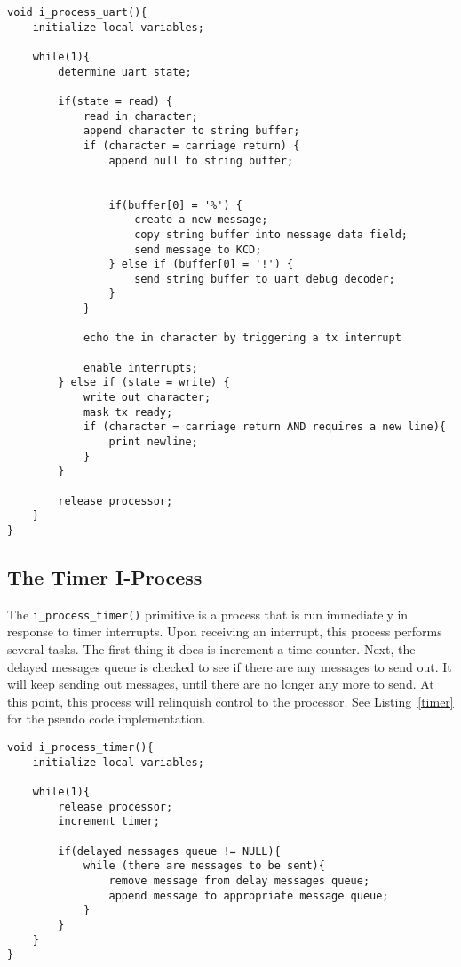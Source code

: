 \documentclass[oneside]{article}
\begin{document}
\begin{lstlisting}
void i_process_uart(){
    initialize local variables;

    while(1){
        determine uart state;

        if(state = read) {
            read in character;
            append character to string buffer;
            if (character = carriage return) {
                append null to string buffer;
                

                if(buffer[0] = '%') {
                    create a new message;
                    copy string buffer into message data field;
                    send message to KCD;                
                } else if (buffer[0] = '!') {
                    send string buffer to uart debug decoder;
                } 
            }

            echo the in character by triggering a tx interrupt

            enable interrupts;
        } else if (state = write) {
            write out character;
            mask tx ready;
            if (character = carriage return AND requires a new line){
                print newline;
            }
        }
    
        release processor;
    }
}
\end{lstlisting}

\subsection*{The Timer I-Process}

The \texttt{i\_process\_timer()} primitive is a process that is run immediately
in response to timer interrupts.  Upon receiving an interrupt, this process
performs several tasks. The first thing it does is increment a time counter.
Next, the delayed messages queue is checked to see if there are any messages to
send out. It will keep sending out messages, until there are no longer any more
to send. At this point, this process will relinquish control to the processor.
See Listing~\ref{timer} for the pseudo code implementation.

\begin{lstlisting}
void i_process_timer(){
    initialize local variables;

    while(1){
        release processor;
        increment timer;

        if(delayed messages queue != NULL){
            while (there are messages to be sent){
                remove message from delay messages queue;
                append message to appropriate message queue;
            }
        }
    }
}
\end{lstlisting}
\end{document}
